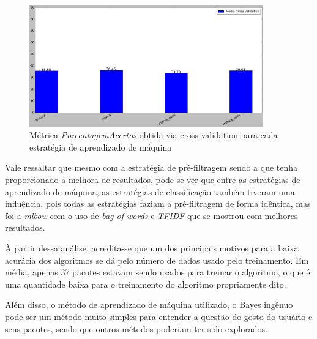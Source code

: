\begin{figure}[h]
  \centering
  \includegraphics[width=0.9\textwidth]{figuras/segundo_experimento_cross_validation.eps}
    \caption{Métrica \textit{PorcentagemAcertos} obtida via cross validation para cada estratégia de aprendizado de máquina}
  \label{fig:segundo_experimento_cross_validation}
\end{figure}

Vale ressaltar que mesmo com a estratégia de pré-filtragem sendo a que tenha
proporcionado a melhora de resultados, pode-se ver que entre as estratégias de
aprendizado de máquina, as estratégias de classificação também tiveram uma
influência, pois todas as estratégias faziam a pré-filtragem de forma idêntica,
mas foi a \textit{mlbow} com o uso de \textit{bag of words} e \textit{TFIDF} que
se mostrou com melhores resultados.

À partir dessa análise, acredita-se que um dos principais motivos para a baixa acurácia dos algoritmos
se dá pelo número de dados usado pelo treinamento. Em média, apenas 37 pacotes
estavam sendo usados para treinar o algoritmo, o que é uma
quantidade baixa para o treinamento do algoritmo propriamente dito.

Além disso, o método de aprendizado de máquina utilizado, o Bayes ingênuo pode
ser um método muito simples para entender a questão do gosto do usuário e seus
pacotes, sendo que outros métodos poderiam ter sido explorados.
